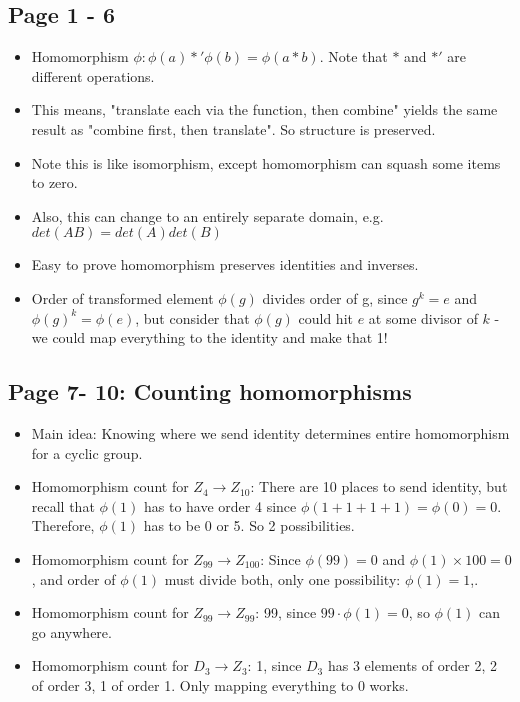 \documentclass[11pt, oneside]{article}   	%
\begin{document}
\subsection{Page 1 - 6}
\begin{itemize}
\item Homomorphism $\phi: \phi(a) *' \phi(b) = \phi(a * b)$.  Note that  $*$ and $*'$ are different  operations.
\item This means, "translate each via the function, then combine" yields the same result as "combine first, then translate".  So structure is preserved.
\item Note this is like isomorphism, except homomorphism can squash some items to zero.
\item Also, this can change to an entirely separate domain, e.g. $det(AB) = det(A)det(B)$
\item Easy to prove homomorphism preserves identities and inverses.
\item Order of transformed element $\phi(g)$ divides order of g, since $g^k = e$ and $\phi(g)^k = \phi(e)$, but consider that $\phi(g)$ could hit $e$ at some divisor of $k$ - we could map everything to the identity and make that 1!
\end{itemize}

\subsection{Page 7- 10: Counting homomorphisms}
\begin{itemize}
\item Main idea: Knowing where we send identity determines entire homomorphism for a cyclic group.
\item Homomorphism count for $Z_4 \rightarrow Z_{10}$: There are 10 places to send identity, but recall that $\phi(1)$ has to have order 4 since $\phi(1 + 1 + 1 + 1) = \phi(0) = 0$.  Therefore, $\phi(1)$ has to be 0 or 5.  So 2 possibilities.
\item Homomorphism count for $Z_{99} \rightarrow Z_{100}$: Since $\phi(99) = 0$ and $\phi(1) \times 100 = 0$, and order of $\phi(1)$ must divide both, only one possibility: $\phi(1) = 1$,.
\item  Homomorphism count for $Z_{99} \rightarrow Z_{99}$: 99, since $99 \cdot \phi(1) = 0$, so $\phi(1)$ can go anywhere.
\item  Homomorphism count for $D_3 \rightarrow Z_3$: 1, since $D_3$ has 3 elements of order 2, 2 of order 3, 1 of order 1.  Only mapping everything to $0$ works.
\end{itemize}
\end{document}

